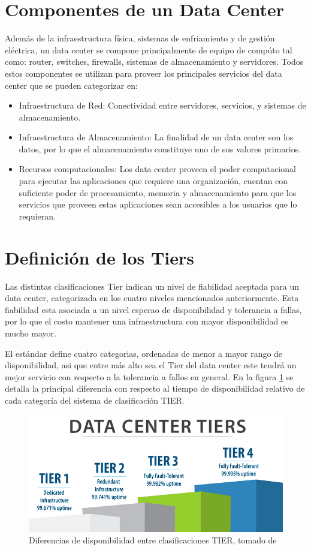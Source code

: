 \documentclass[journal]{IEEEtran}
\begin{document}
\section{Componentes de un Data Center}
Además de la infraestructura física, sistemas de enfriamiento y de gestión eléctrica, un data center se compone principalmente de equipo de compúto tal como:
router, switches, firewalls, sistemas de almacenamiento y servidores.
Todos estos componentes se utilizan para proveer los principales servicios del data center que se pueden categorizar en:
\begin{itemize}
  \item Infraestructura de Red: Conectividad entre servidores, servicios, y sistemas de almacenamiento.
  \item Infraestructura de Almacenamiento: La finalidad de un data center son los datos, por lo que el almacenamiento constituye uno de sus valores primarios.
  \item Recursos computacionales: Los data center proveen el poder computacional para ejecutar las aplicaciones que requiere una organización, cuentan con suficiente poder de procesamiento, memoria y almacenamiento para que 
  los servicios que proveen estas aplicaciones sean accesibles a los usuarios que lo requieran.
\end{itemize}

\section{Definición de los Tiers}
Las distintas clasificaciones Tier indican un nivel de fiabilidad aceptada para un data center, categorizada en los cuatro
niveles mencionados anteriormente. Esta fiabilidad esta asociada a un nivel esperao de disponibilidad y tolerancia a fallas, por lo que el costo
mantener una infraestructura con mayor disponibilidad es mucho mayor.

El estándar define cuatro categorias, ordenadas de menor a mayor rango de disponibilidad, asi que entre más alto sea el Tier del data center
este tendrá un mejor servicio con respecto a la tolerancia a fallos en general. 
En la figura \ref{volico} se detalla la principal diferencia con respecto al tiempo de disponibilidad relativo de cada categoría del sistema de clasificación TIER.
\begin{figure}
  \centering
  \includegraphics[scale=0.3]{Data-Center-Tiers.jpg}
  \caption{Diferencias de disponibilidad entre clasificaciones TIER, tomado de \cite{volico_2018}}
  \label{volico}
\end{figure}
\end{document}
